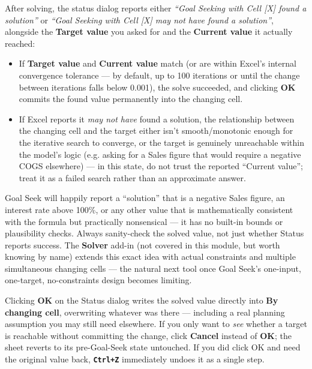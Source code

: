 \documentclass[11pt,a4paper]{article}
\newcommand{\key}[1]{\texttt{\colorbox{black!8}{\textbf{#1}}}}
\begin{document}
After solving, the status dialog reports either \textit{``Goal Seeking with Cell [X] found a solution''} or \textit{``Goal Seeking with Cell [X] may not have found a solution''}, alongside the \textbf{Target value} you asked for and the \textbf{Current value} it actually reached:

\begin{itemize}
  \item If \textbf{Target value} and \textbf{Current value} match (or are within Excel's internal convergence tolerance --- by default, up to 100 iterations or until the change between iterations falls below 0.001), the solve succeeded, and clicking \textbf{OK} commits the found value permanently into the changing cell.
  \item If Excel reports it \emph{may not have} found a solution, the relationship between the changing cell and the target either isn't smooth/monotonic enough for the iterative search to converge, or the target is genuinely unreachable within the model's logic (e.g. asking for a Sales figure that would require a negative COGS elsewhere) --- in this state, do not trust the reported ``Current value''; treat it as a failed search rather than an approximate answer.
\end{itemize}

\begin{pitfall}
Goal Seek will happily report a ``solution'' that is a negative Sales figure, an interest rate above 100\%, or any other value that is mathematically consistent with the formula but practically nonsensical --- it has no built-in bounds or plausibility checks. Always sanity-check the solved value, not just whether Status reports success. The \textbf{Solver} add-in (not covered in this module, but worth knowing by name) extends this exact idea with actual constraints and multiple simultaneous changing cells --- the natural next tool once Goal Seek's one-input, one-target, no-constraints design becomes limiting.
\end{pitfall}

\begin{pitfall}
Clicking \textbf{OK} on the Status dialog writes the solved value directly into \textbf{By changing cell}, overwriting whatever was there --- including a real planning assumption you may still need elsewhere. If you only want to \emph{see} whether a target is reachable without committing the change, click \textbf{Cancel} instead of \textbf{OK}; the sheet reverts to its pre-Goal-Seek state untouched. If you did click OK and need the original value back, \key{Ctrl+Z} immediately undoes it as a single step.
\end{pitfall}
\end{document}
